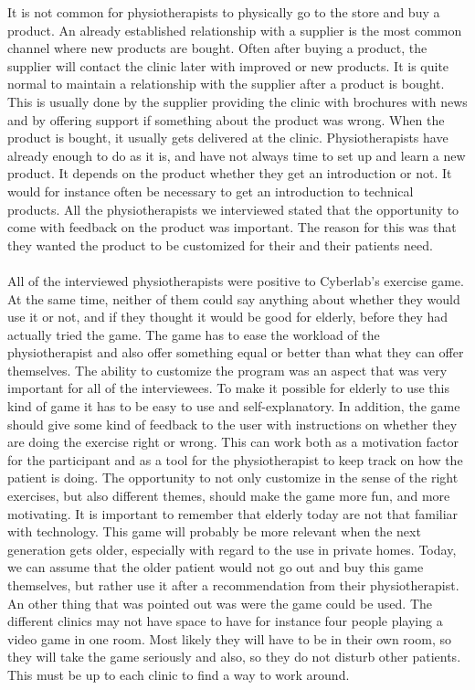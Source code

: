 It is not common for physiotherapists to physically go to the store and buy a product. An already established relationship with a supplier is the most common channel where new products are bought. Often after buying a product, the supplier will contact the clinic later with improved or new products. It is quite normal to maintain a relationship with the supplier after a product is bought. This is usually done by the supplier providing the clinic with brochures with news and by offering support if something about the product was wrong. When the product is bought, it usually gets delivered at the clinic. Physiotherapists have already enough to do as it is, and have not always time to set up and learn a new product. It depends on the product whether they get an introduction or not. It would for instance often be necessary to get an introduction to technical products. All the physiotherapists we interviewed stated that the opportunity to come with feedback on the product was important. The reason for this was that they wanted the product to be customized for their and their patients need. \\ \\
All of the interviewed physiotherapists were positive to Cyberlab’s exercise game. At the same time, neither of them could say anything about whether they would use it or not, and if they thought it would be good for elderly, before they had actually tried the game. The game has to ease the workload of the physiotherapist and also offer something equal or better than what they can offer themselves. The ability to customize the program was an aspect that was very important for all of the interviewees. To make it possible for elderly to use this kind of game it has to be easy to use and self-explanatory. In addition, the game should give some kind of feedback to the user with instructions on whether they are doing the exercise right or wrong. This can work both as a motivation factor for the participant and as a tool for the physiotherapist to keep track on how the patient is doing. The opportunity to not only customize in the sense of the right exercises, but also different themes, should make the game more fun, and more motivating. It is important to remember that elderly today are not that familiar with technology. This game will probably be more relevant when the next generation gets older, especially with regard to the use in private homes. Today, we can assume that the older patient would not go out and buy this game themselves, but rather use it after a recommendation from their physiotherapist. An other thing that was pointed out was were the game could be used. The different clinics may not have space to have for instance four people playing a video game in one room. Most likely they will have to be in their own room, so they will take the game seriously and also, so they do not disturb other patients. This must be up to each clinic to find a way to work around.\\ \\

